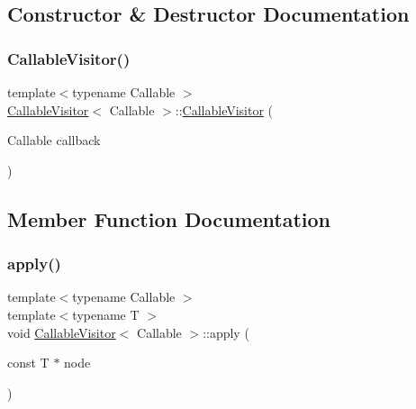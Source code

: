 \subsection{Constructor \& Destructor Documentation}
\mbox{\label{struct_callable_visitor_af9bd3a4132494b0c91dc4f7b46e5dd0e}} 
\subsubsection{\texorpdfstring{Callable\+Visitor()}{CallableVisitor()}}
{\footnotesize\ttfamily template$<$typename Callable $>$ \\
\hyperlink{struct_callable_visitor}{Callable\+Visitor}$<$ Callable $>$\+::\hyperlink{struct_callable_visitor}{Callable\+Visitor} (\begin{DoxyParamCaption}\item[{Callable}]{callback }\end{DoxyParamCaption})\hspace{0.3cm}{\ttfamily [inline]}}



\subsection{Member Function Documentation}
\mbox{\label{struct_callable_visitor_a3a87ffcad17dec5020d4302d536761bb}} 
\subsubsection{\texorpdfstring{apply()}{apply()}}
{\footnotesize\ttfamily template$<$typename Callable $>$ \\
template$<$typename T $>$ \\
void \hyperlink{struct_callable_visitor}{Callable\+Visitor}$<$ Callable $>$\+::apply (\begin{DoxyParamCaption}\item[{const T $\ast$}]{node }\end{DoxyParamCaption})\hspace{0.3cm}{\ttfamily [inline]}}

\mbox{\label{struct_callable_visitor_a42c5d8c38a69bd7365df154e75352d68}} 
